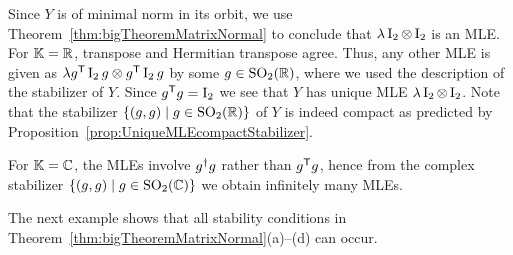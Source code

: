 \begin{example}
	Since $Y$ is of minimal norm in its orbit, we use Theorem~\ref{thm:bigTheoremMatrixNormal} to conclude that $\lambda \operatorname{I}_2 \otimes \operatorname{I}_2$ is an MLE. 
	For $\mathbb K = \mathbb R$, transpose and Hermitian transpose agree. Thus, any other MLE is given as $\lambda g^{\mathsf{T}} \operatorname{I}_2 g \otimes g^{\mathsf{T}} \operatorname{I}_2 g$ by some $g \in \operatorname{SO}_2(\mathbb R)$, where we used the description of the stabilizer of $Y$. Since $g^{\mathsf{T}} g = \operatorname{I}_2$ we see that $Y$ has unique MLE $\lambda \operatorname{I}_2 \otimes \operatorname{I}_2$. Note that the stabilizer $\lbrace (g,g) \mid g \in \operatorname{SO}_2(\mathbb R) \rbrace$ of $Y$ is indeed compact as predicted by Proposition~\ref{prop:UniqueMLEcompactStabilizer}.
	
	For $\mathbb K = \mathbb C$, the MLEs involve $g^{\dagger} g$ rather than $g^{\mathsf{T}} g$, hence from the complex stabilizer $\lbrace (g,g) \mid g \in \operatorname{SO}_2(\mathbb C) \rbrace$ we obtain infinitely many MLEs.
	\hfill\exSymbol
\end{example}

The next example shows that all stability conditions in Theorem~\ref{thm:bigTheoremMatrixNormal}(a)--(d) can occur.

